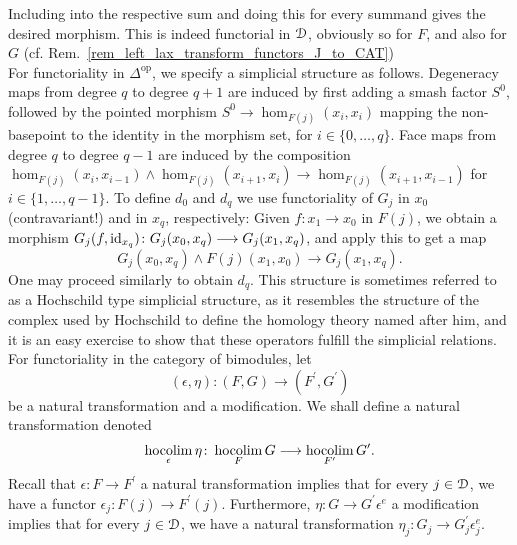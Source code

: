 \begin{defn}
      Including into the respective sum and doing this for every summand gives the desired morphism. This is indeed functorial in $\mathcal{D}$, obviously so for $F$, and also for $G$ (cf. Rem.~\ref{rem_left_lax_transform_functors_J_to_CAT})\\
      For functoriality in $\Delta^{\mathrm{op}}$, we specify a simplicial structure as follows.
      Degeneracy maps from degree $q$ to degree $q+1$ are induced by first adding a smash factor $S^0$, followed by the pointed morphism $S^0 \to \hom_{F(j)}(x_i,x_i)$ mapping the non-basepoint to the identity in the morphism set, for $i \in \{ 0, \ldots, q \}$.
      Face maps from degree $q$ to degree $q-1$ are induced by the composition $\hom_{F(j)}(x_i,x_{i-1}) \wedge \hom_{F(j)}(x_{i+1},x_i) \to \hom_{F(j)}(x_{i+1},x_{i-1})$ for $i \in \{ 1, \ldots, q-1 \}$.
      To define $d_0$ and $d_q$ we use functoriality of $G_j$ in $x_0$ (contravariant!) and in $x_q$, respectively:
      Given $f: x_1 \to x_0$ in $F(j)$, we obtain a morphism $G_j(f,\operatorname{id}_{x_q}) \colon G_j(x_0,x_q) \longrightarrow G_j(x_1,x_q)$, and apply this to get a map
      \begin{displaymath}
        G_j(x_0,x_q) \wedge F(j)(x_1,x_0) \to G_j(x_1,x_q).
      \end{displaymath}
      One may proceed similarly to obtain $d_q$.
      This structure is sometimes referred to as a Hochschild type simplicial structure, as it resembles the structure of the complex used by Hochschild to define the homology theory named after him, and it is an easy exercise to show that these operators fulfill the simplicial relations.\\
      For functoriality in the category of bimodules, let
      \begin{displaymath}
        (\epsilon, \eta) \colon (F,G) \to (F^\prime, G^\prime)
      \end{displaymath}
      be a natural transformation and a modification.
      We shall define a natural transformation denoted
      \begin{displaymath}
        \operatorname*{hocolim}_\epsilon \eta \colon \operatorname*{hocolim}_F G \longrightarrow \operatorname*{hocolim}_{F^\prime} G^\prime.
      \end{displaymath}
      Recall that $\epsilon \colon F \to F^\prime$ a natural transformation implies that for every $j \in \mathcal{D}$, we have a functor $\epsilon_j \colon F(j) \to F^\prime(j)$.
      Furthermore, $\eta \colon G \to G^\prime \epsilon^e$ a modification implies that for every $j \in \mathcal{D}$, we have a natural transformation $\eta_j \colon G_j \to G^\prime_j\epsilon^e_j$.

\end{defn}
